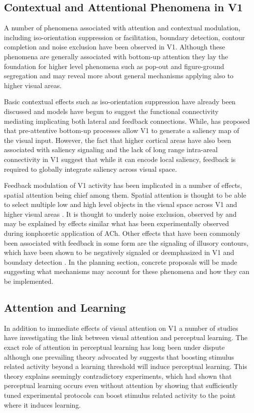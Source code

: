\subsection{Contextual and Attentional Phenomena in V1}

A number of phenomena associated with attention and contextual
modulation, including iso-orientation suppression or facilitation,
boundary detection, contour completion and noise exclusion have been
observed in V1. Although these phenomena are generally associated with
bottom-up attention they lay the foundation for higher level phenomena
such as pop-out and figure-ground segregation and may reveal more
about general mechanisms applying also to higher visual areas.

Basic contextual effects such as iso-orientation suppression have
already been discussed and models have begun to suggest the functional
connectivity mediating implicating both lateral and feedback
connections. While, \cite{Li2002} has proposed that pre-attentive
bottom-up processes allow V1 to generate a saliency map of the visual
input. However, the fact that higher cortical areas have also been
associated with saliency signaling and the lack of long range
intra-areal connectivity in V1 suggest that while it can encode local
saliency, feedback is required to globally integrate saliency across
visual space.

Feedback modulation of V1 activity has been implicated in a number of
effects, spatial attention being chief among them. Spatial attention
is thought to be able to select multiple low and high level objects in
the visual space across V1 and higher visual areas
\citep{McMains2004}. It is thought to underly noise exclusion,
observed by \cite{Dosher2000} and may be explained by effects similar
what has been experimentally observed during ionphoretic application
of ACh. Other effects that have been commonly been associated with
feedback in some form are the signaling of illusory contours, which
have been shown to be negatively signaled or deemphasized in V1
\citep{Ramsden2001} and boundary detection \citep{Poort2012}.  In the
planning section, concrete proposals will be made suggesting what
mechanisms may account for these phenomena and how they can be
implemented.

\subsection{Attention and Learning}

In addition to immediate effects of visual attention on V1 a number of
studies have investigating the link between visual attention and
perceptual learning. The exact role of attention in perceptual
learning has long been under dispute although one prevailing theory
advocated by \cite{Seitz2007} suggests that boosting stimulus related
activity beyond a learning threshold will induce perceptual
learning. This theory explains seemingly contradictory experiments,
which had shown that perceptual learning occurs even without attention
\citep{Watanabe2001} by showing that sufficiently tuned experimental
protocols can boost stimulus related activity to the point where it
induces learning.

